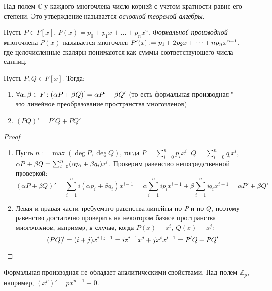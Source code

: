 \begin{note}
	Над полем $\mathbb{C}$ у каждого многочлена число корней с учетом кратности равно его степени. Это утверждение называется \textit{основной теоремой алгебры}.
\end{note}

\begin{definition}
	Пусть $P \in F[x]$, $P(x) = p_0 + p_1x + \dots + p_nx^n$. \textit{Формальной производной} многочлена $P(x)$ называется многочлен $P'(x) \hm{:=} p_1 + 2p_2x + \dots + np_nx^{n - 1}$, где целочисленные скаляры понимаются как суммы соответствующего числа единиц.
\end{definition}

\begin{proposition}
	Пусть $P, Q \in F[x]$. Тогда:
	\begin{enumerate}
		\item $\forall \alpha, \beta \in F: (\alpha P+ \beta Q)' \hm= \alpha P' + \beta Q'$ (то есть формальная производная "--- это линейное преобразование пространства многочленов)
		\item $(PQ)' = P'Q + PQ'$
	\end{enumerate}
\end{proposition}

\begin{proof}~
	\begin{enumerate}
		\item Пусть $n := \max{(\deg{P}, \deg{Q})}$, тогда $P = \sum_{i = 0}^np_ix^i$, $Q = \sum_{i = 0}^nq_ix^i$, $\alpha P + \beta Q \hm= \sum_{i = 0}^n(\alpha p_i + \beta q_i)x^i$. Проверим равенство непосредственной проверкой:
		\[(\alpha P + \beta Q)' = \sum_{i = 1}^ni(\alpha p_i + \beta q_i)x^{i - 1} = \alpha\sum_{i = 1}^nip_ix^{i - 1} + \beta\sum_{i = 1}^niq_ix^{i - 1} = \alpha P' + \beta Q'\]
		
		\item Левая и правая части требуемого равенства линейны по $P$ и по $Q$, поэтому равенство достаточно проверить на некотором базисе пространства многочленов, например, в случае, когда $P(x) = x^i$, $Q(x) = x^j$:
		\[(PQ)' = (i + j)x^{i + j - 1} = ix^{i - 1}x^j + jx^ix^{j - 1} = P'Q + PQ'\qedhere\]
	\end{enumerate}
\end{proof}

\begin{note}
	Формальная производная не обладает аналитическими свойствами. Над полем $\mathbb{Z}_p$, например, $(x^p)' = px^{p - 1} \equiv 0$.
\end{note}

